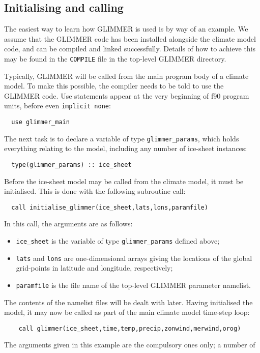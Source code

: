 \subsection{Initialising and calling}

The easiest way to learn how GLIMMER is used is by way of an
example. We assume that the GLIMMER code has been installed alongside the
climate model code, and can be compiled and linked successfully. Details of
how to achieve this may be found in the \texttt{COMPILE} file in the top-level
GLIMMER directory. 

Typically, GLIMMER will be called from the main program body of a
climate model. To make this possible, the compiler needs to be told to use the
GLIMMER code. Use statements appear at the very beginning of f90 program
units, before even \texttt{implicit none}:
%
\begin{verbatim}
  use glimmer_main
\end{verbatim}
%
The next task is to declare a variable of type \texttt{glimmer\_params}, which
holds everything relating to the model, including any number of ice-sheet
instances:
%
\begin{verbatim}
  type(glimmer_params) :: ice_sheet
\end{verbatim}
%
Before the ice-sheet model may be called from the climate model, it must be
initialised. This is done with the following subroutine call:
%
\begin{verbatim}
  call initialise_glimmer(ice_sheet,lats,lons,paramfile)
\end{verbatim}
%
In this call, the arguments are as follows:
%
\begin{itemize}
\item \texttt{ice\_sheet} is the variable of type \texttt{glimmer\_params}
 defined above;
\item \texttt{lats} and \texttt{lons} are one-dimensional arrays giving the
  locations of the global grid-points in latitude and longitude, respectively; 
\item \texttt{paramfile} is the file name of the top-level GLIMMER parameter
  namelist.
\end{itemize}
%
The contents of the namelist files will be dealt with later. Having
initialised the model, it may now be called as part of the main climate
model time-step loop:
%
\begin{verbatim}
    call glimmer(ice_sheet,time,temp,precip,zonwind,merwind,orog)
\end{verbatim} 
%
The arguments given in this example are the compulsory ones only; a number of
